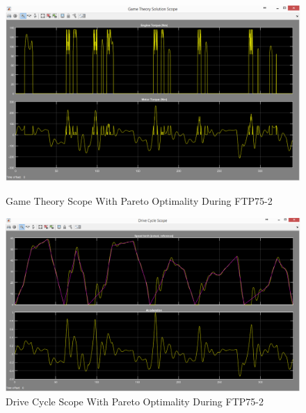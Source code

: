 \begin{figure}[hp]
\centering
\includegraphics[scale=0.46]{figures/Pareto/FTP75-2/gameTheory03Juli}
\caption{Game Theory Scope With Pareto Optimality During FTP75-2}
\label{fig:gtpo2}
\includegraphics[scale=0.44]{figures/Pareto/FTP75-2/driveCycle03Juli}
\caption{Drive Cycle Scope With Pareto Optimality During FTP75-2}
\label{fig:dcpo2}
\end{figure}

